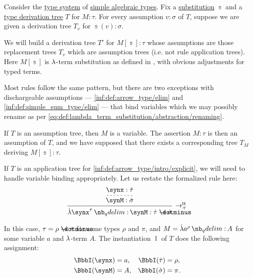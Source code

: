 \begin{algorithm}\label{alg:simply_typed_substitution}
  Consider the \hyperref[def:abstract_type_system]{type system} of \hyperref[def:simple_algebraic_types]{simple algebraic types}. Fix a \hyperref[def:lambda_term_substitution]{substitution} \( \Bbbs \) and a \hyperref[def:type_derivation_tree]{type derivation tree} \( T \) for \( M: \tau \). For every assumption \( v: \sigma \) of \( T \), suppose we are given a derivation tree \( T_v \) for \( \Bbbs(v): \sigma \).

  We will build a derivation tree \( T' \) for \( M[\Bbbs]: \tau \) whose assumptions are those replacement trees \( T_v \) which are assumption trees (i.e. not rule application trees). Here \( M[\Bbbs] \) is \( {\mathrm \lambda} \)-term substitution as defined in , with obvious adjustments for typed terms.

  Most rules follow the same pattern, but there are two exceptions with dischargeable assumptions --- \ref{inf:def:arrow_type/elim} and \ref{inf:def:simple_sum_type/elim} --- that bind variables which we may possibly rename as per \eqref{eq:def:lambda_term_substitution/abstraction/renaming}.

  \begin{thmenum}
     If \( T \) is an assumption tree, then \( M \) is a variable. The assertion \( M: \tau \) is then an assumption of \( T \), and we have supposed that there exists a corresponding tree \( T_M \) deriving \( M[\Bbbs]: \tau \).

     If \( T \) is an application tree for \ref{inf:def:arrow_type/intro/explicit}, we will need to handle variable binding appropriately. Let us restate the formalized rule here:
    \begin{equation*}
      \begin{prooftree}
        \hypo{ \synx: \syn\tau }
        \infer[dashed]1{ \synM: \syn\sigma }
        \infer1[\ensuremath{ \rightarrow_+^{\logic{tt}} }]{ \qabs {\synx^{\syn\tau}} \synM: \syn\tau \synimplies \syn\sigma }
      \end{prooftree}
    \end{equation*}

    In this case, \( \tau = \rho \synimplies \pi \) for some types \( \rho \) and \( \pi \), and \( M = \qabs {a^\rho} A \) for some variable \( a \) and \( {\mathrm \lambda} \)-term \( A \). The instantiation \( \BbbI \) of \( T \) does the following assignment:
    \begin{align*}
      \BbbI(\synx) &= a, &\BbbI(\syn\tau) &= \rho, \\
      \BbbI(\synM) &= A, &\BbbI(\syn\sigma) &= \pi.
    \end{align*}


\end{thmenum}
\end{algorithm}
